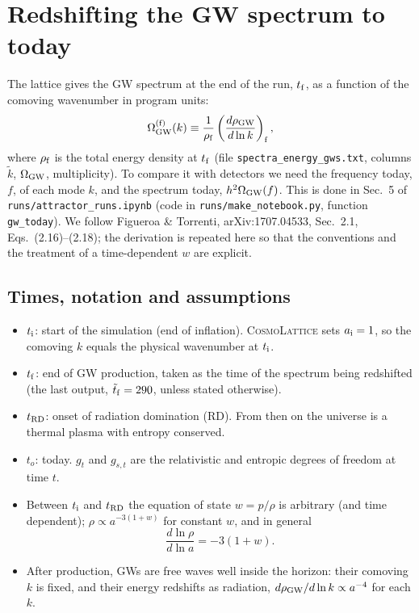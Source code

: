 \documentclass[11pt,a4paper]{article}
\newcommand{\file}[1]{\texttt{#1}}
\begin{document}
\section{Redshifting the GW spectrum to today}
\label{sec:redshift}
The lattice gives the GW spectrum at the end of the run, $t_{\rm f}$, as a function of the comoving wavenumber in program units:
\begin{equation}
\Omega_{\rm GW}^{(\rm f)}(k)\equiv\frac{1}{\rho_{\rm f}}\left(\frac{d\rho_{\rm GW}}{d\ln k}\right)_{\rm f},
\end{equation}
where $\rho_{\rm f}$ is the total energy density at $t_{\rm f}$ (file \file{spectra\_energy\_gws.txt}, columns $\tilde k$, $\Omega_{\rm GW}$, multiplicity). To compare it with detectors we need the frequency today, $f$, of each mode $k$, and the spectrum today, $h^2\Omega_{\rm GW}(f)$. This is done in Sec.~5 of \file{runs/attractor\_runs.ipynb} (code in \file{runs/make\_notebook.py}, function \texttt{gw\_today}). We follow Figueroa \& Torrenti, arXiv:1707.04533, Sec.~2.1, Eqs.~(2.16)--(2.18); the derivation is repeated here so that the conventions and the treatment of a time-dependent $w$ are explicit.

\subsection{Times, notation and assumptions}
\begin{itemize}
\item $t_{\rm i}$: start of the simulation (end of inflation). \textsc{CosmoLattice} sets $a_{\rm i}=1$, so the comoving $k$ equals the physical wavenumber at $t_{\rm i}$.
\item $t_{\rm f}$: end of GW production, taken as the time of the spectrum being redshifted (the last output, $\tilde t_{\rm f}=290$, unless stated otherwise).
\item $t_{\rm RD}$: onset of radiation domination (RD). From then on the universe is a thermal plasma with entropy conserved.
\item $t_o$: today. $g_t$ and $g_{s,t}$ are the relativistic and entropic degrees of freedom at time $t$.
\item Between $t_{\rm i}$ and $t_{\rm RD}$ the equation of state $w=p/\rho$ is arbitrary (and time dependent); $\rho\propto a^{-3(1+w)}$ for constant $w$, and in general
\begin{equation}
\frac{d\ln\rho}{d\ln a}=-3(1+w).\label{eq:rhoscaling}
\end{equation}
\item After production, GWs are free waves well inside the horizon: their comoving $k$ is fixed, and their energy redshifts as radiation, $d\rho_{\rm GW}/d\ln k\propto a^{-4}$ for each $k$.
\end{itemize}
\end{document}
